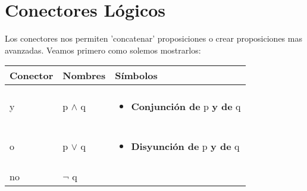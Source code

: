 \documentclass[12pt]{report}                                    %
\begin{document}
    \clearpage
    \section{Conectores Lógicos}

        Los conectores nos permiten 'concatenar' proposiciones o crear proposiciones mas avanzadas. 
        Veamos primero como solemos mostrarlos:

        \begin{longtable}{p{35mm} || p{30mm} || p{80mm}}

            \textbf{\large Conector}
            &
            \textbf{\large Nombres}
            &
            \textbf{\large Símbolos}
            \\[1.5ex]
            \hline\hline
            & & \\                                                                    
            \endhead                                                     

            \large y  &  \large{p $\land$ q}                                    &

            \begin{minipage}[t]{\textwidth}\begin{itemize}
                \item \textbf{Conjunción de} p \textbf{y de} q
            \end{itemize}\end{minipage}                                                 \\[1.5ex]
            
            \hline & & \\ \large o  &  \large{p $\lor$ q}                               &
            
            \begin{minipage}[t]{\textwidth}\begin{itemize}
                \item \textbf{Disyunción de} p \textbf{y de} q
            \end{itemize}\end{minipage}                                                 \\[1.5ex]


            \hline & & \\ \large no  &  \large{$\lnot$ q}                               &


\end{longtable}
\end{document}
